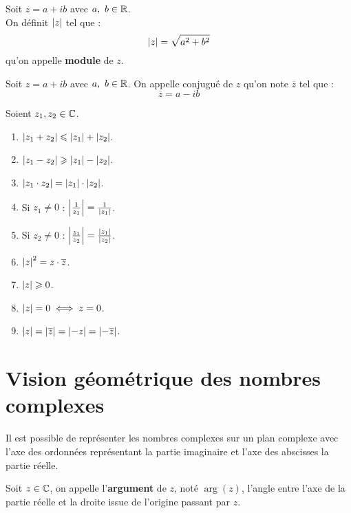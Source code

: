 \begin{definition}
    Soit $z = a + ib$ avec $a,\ b \in \mathbb{R}$. 
    \\
    On définit $\abs{z}$ tel que :
    \[ \abs{z} = \sqrt{a^2 + b^2} \]
    qu'on appelle \textbf{module} de $z$.
\end{definition}

\begin{definition}
    Soit $z = a + ib$ avec $a,\ b \in \mathbb{R}$. On appelle conjugué de $z$ qu'on note $\overline{z}$ tel que :
    \[ \overline{z} = a - ib \]
\end{definition}

\begin{proposition}
    Soient $z_1, z_2 \in \mathbb{C}$.
    \begin{enumerate}
            \item $\abs{z_1 + z_2} \leqslant \abs{z_1} + \abs{z_2}$.
            \item $\abs{z_1 - z_2} \geqslant \abs{z_1} - \abs{z_2}$.
            \item $\abs{z_1 \cdot z_2} = \abs{z_1} \cdot \abs{z_2}$.
            \item Si $z_1 \neq 0$ : $\abs{\frac{1}{z_1}} = \frac{1}{\abs{z_1}}$.
            \item Si $z_2 \neq 0$ : $\abs{\frac{z_1}{z_2}} = \frac{\abs{z_1}}{\abs{z_2}}$.
            \item $\abs{z}^2 = z \cdot \overline{z}$.
            \item $\abs{z} \geqslant 0$.
            \item $\abs{z} = 0 \iff z = 0$.
            \item $\abs{z} = \abs{\overline{z}} = \abs{-z} = \abs{-\overline{z}}$.
        \end{enumerate}
\end{proposition}

\section{Vision géométrique des nombres complexes}
Il est possible de représenter les nombres complexes sur un plan complexe avec l'axe des ordonnées représentant la partie imaginaire et l'axe des abscisses la partie réelle.

\begin{definition}
	Soit $z \in \mathbb{C}$, on appelle l'\textbf{argument} de $z$, noté $\arg(z)$, l'angle entre l'axe de la partie réelle et la droite issue de l'origine passant par $z$. 
\end{definition}

